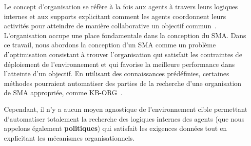 \documentclass[contribution]{jfsma}
\begin{document}

Le concept d'organisation se réfère à la fois aux agents à travers leurs logiques internes et aux supports explicitant comment les agents coordonnent leurs activités pour atteindre de manière collaborative un objectif commun~\cite{Picard2009}. L'organisation occupe une place fondamentale dans la conception du SMA.
%
%
%
%
%
Dans ce travail, nous abordons la conception d'un SMA comme un problème d’optimisation consistant à trouver l’organisation qui satisfait les contraintes de déploiement de l’environnement et qui favorise la meilleure performance dans l’atteinte d’un objectif.
En utilisant des connaissances prédéfinies, certaines méthodes pourraient automatiser des parties de la recherche d'une organisation de SMA appropriée, comme KB-ORG~\cite{Sims2008}.

Cependant, il n'y a aucun moyen agnostique de l'environnement cible permettant d'automatiser totalement la recherche des logiques internes des agents (que nous appelons également \textbf{politiques}) qui satisfait les exigences données tout en explicitant les mécanismes organisationnels. %
\end{document}
